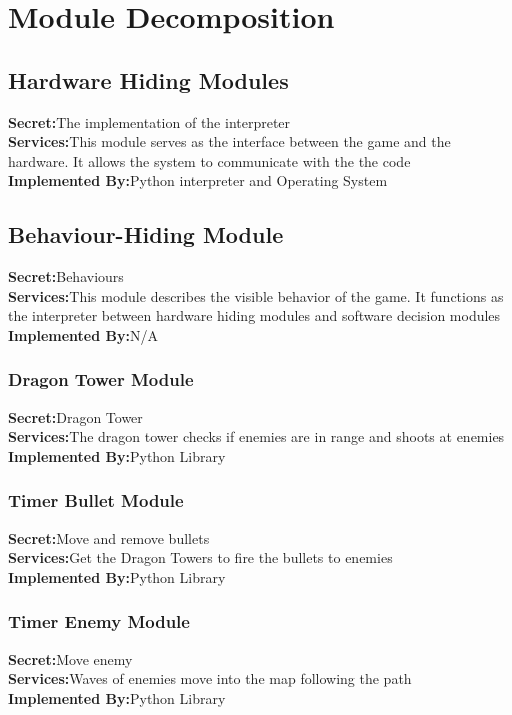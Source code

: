 \documentclass{article}
\begin{document}
\section{Module Decomposition}
\subsection{Hardware Hiding Modules}
\textbf{Secret:}The implementation of the interpreter\\
\textbf{Services:}This module serves as the interface between the game and the hardware. It allows the system to communicate with the the code\\
\textbf{Implemented By:}Python interpreter and Operating System\\

\subsection{Behaviour-Hiding Module}
\textbf{Secret:}Behaviours\\
\textbf{Services:}This module describes the visible behavior of the game. It functions as the interpreter between hardware hiding modules and software decision modules\\
\textbf{Implemented By:}N/A\\

\subsubsection{Dragon Tower Module}
\textbf{Secret:}Dragon Tower\\
\textbf{Services:}The dragon tower checks if enemies are in range and shoots at enemies\\
\textbf{Implemented By:}Python Library\\

\subsubsection{Timer Bullet Module}
\textbf{Secret:}Move and remove bullets\\
\textbf{Services:}Get the Dragon Towers to fire the bullets to enemies\\
\textbf{Implemented By:}Python Library\\

\subsubsection{Timer Enemy Module}
\textbf{Secret:}Move enemy\\
\textbf{Services:}Waves of enemies move into the map following the path\\
\textbf{Implemented By:}Python Library\\
\end{document}
